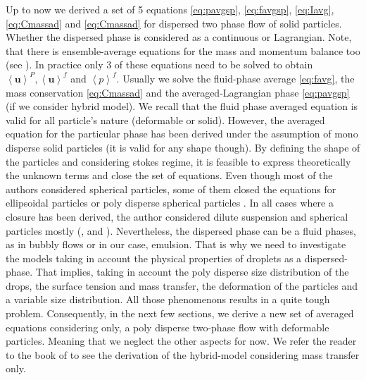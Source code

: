 Up to now we derived a set of 5 equations \ref{eq:pavgsp}, \ref{eq:favgsp}, \ref{eq:Iavg}, \ref{eq:Cmassad} and \ref{eq:Cmassad} for dispersed two phase flow of solid particles. 
Whether the dispersed phase is considered as a continuous or Lagrangian.  
Note, that there is ensemble-average equations for the mass and momentum balance too (see \cite{nott2011suspension}). 
In practice only 3 of these equations need to be solved to obtain $\left<\textbf{u}\right>^P,\left<\textbf{u}\right>^f$ and $\left<p\right>^f$. 
Usually we solve the fluid-phase average \ref{eq:favg}, the mass conservation \ref{eq:Cmassad} and the averaged-Lagrangian phase \ref{eq:pavgsp} (if we consider hybrid model).
We recall that the fluid phase averaged equation is valid for all particle's nature (deformable or solid). 
However, the averaged equation for the particular phase has been derived under the assumption of mono disperse solid particles (it is valid for any shape though).
By defining the shape of the particles and considering stokes regime, it is feasible to express theoretically the unknown terms and close the set of equations. 
Even though most of the authors considered spherical particles, some of them closed the equations for ellipsoidal particles \citep{batchelor1970stress} or poly disperse spherical particles \citep{zhang1994averaged}.
In all cases where a closure has been derived, the author considered dilute suspension and spherical particles mostly (\cite{jackson1997locally}, \cite{zhang1994ensemble} and \cite{batchelor1970stress}).  
Nevertheless, the dispersed phase can be a fluid phases, as in bubbly flows or in our case, emulsion. 
That is why we need to investigate the models taking in account the physical properties of droplets as a dispersed-phase.
That implies, taking in account the poly disperse size distribution of the drops, the surface tension and mass transfer, the deformation of the particles and a variable size distribution. 
All those phenomenons results in a quite tough problem.
Consequently, in the next few sections, we derive a new set of averaged equations considering only, a poly disperse two-phase flow with deformable particles.
Meaning that we neglect the other aspects for now.
We refer the reader to the book of \citet{morel2015mathematical} to see the derivation of the hybrid-model considering mass transfer only.  


